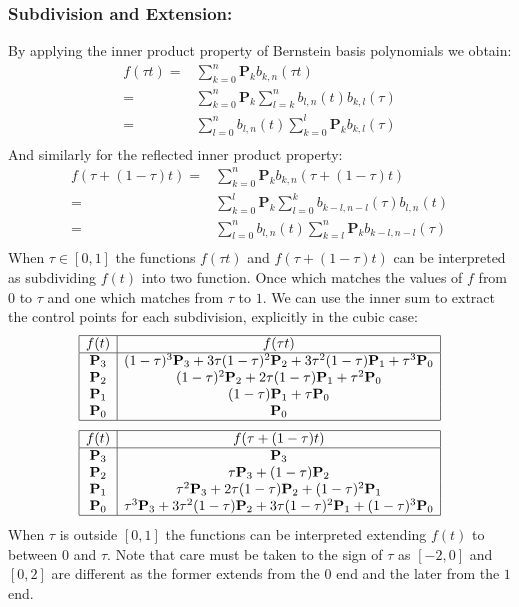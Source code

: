 \subsubsection{Subdivision and Extension:}
By applying the inner product property of Bernstein basis polynomials we obtain:
\[\begin{aligned}
	f(\tau t) =& \sum_{k=0}^n\mathbf{P}_kb_{k,n}(\tau t)\\
	=&\sum_{k=0}^n\mathbf{P}_k\sum_{l=k}^nb_{l,n}(t)b_{k,l}(\tau)\\
	=&\sum_{l=0}^nb_{l,n}(t)\sum_{k=0}^l\mathbf{P}_kb_{k,l}(\tau)\\
\end{aligned}\]
And similarly for the reflected inner product property:
\[\begin{aligned}
	f(\tau +(1-\tau)t)=& \sum_{k=0}^n\mathbf{P}_kb_{k,n}(\tau+(1-\tau)t)\\
	=&\sum_{k=0}^l\mathbf{P}_k\sum_{l=0}^kb_{k-l,n-l}(\tau)b_{l,n}(t)\\
	=&\sum_{l=0}^nb_{l,n}(t)\sum_{k=l}^n\mathbf{P}_kb_{k-l,n-l}(\tau)\\
\end{aligned}\]
When $\tau\in[0,1]$ the functions $f(\tau t)$ and $f(\tau + (1-\tau)t)$ can be interpreted as subdividing $f(t)$ into two function.
Once which matches the values of $f$ from $0$ to $\tau$ and one which matches from $\tau$ to $1$.
We can use the inner sum to extract the control points for each subdivision,
explicitly in the cubic case:
\[\begin{array}{|c|c|}
	\hline
	f(t)&f(\tau t)\\
	\hline
	\mathbf{P}_3&(1-\tau)^3\mathbf{P}_3+3\tau(1-\tau)^2\mathbf{P}_2+3\tau^2(1-\tau)\mathbf{P}_1+\tau^3\mathbf{P}_0\\
	\mathbf{P}_2&(1-\tau)^2\mathbf{P}_2+2\tau(1-\tau)\mathbf{P}_1+\tau^2\mathbf{P}_0\\
	\mathbf{P}_1&(1-\tau)\mathbf{P}_1+\tau \mathbf{P}_0\\
	\mathbf{P}_0&\mathbf{P}_0\\
	\hline
\end{array}\]
\[\begin{array}{|c|c|}
	\hline
	f(t)&f(\tau+(1-\tau)t)\\
	\hline
	\mathbf{P}_3&\mathbf{P}_3\\
	\mathbf{P}_2&\tau \mathbf{P}_3+(1-\tau)\mathbf{P}_2\\
	\mathbf{P}_1&\tau^2\mathbf{P}_3+2\tau(1-\tau)\mathbf{P}_2+(1-\tau)^2\mathbf{P}_1\\
	\mathbf{P}_0&\tau^3\mathbf{P}_3+3\tau^2(1-\tau)\mathbf{P}_2+3\tau(1-\tau)^2\mathbf{P}_1+(1-\tau)^3\mathbf{P}_0\\
	\hline
\end{array}\]
When $\tau$ is outside $[0,1]$ the functions can be interpreted extending $f(t)$ to between $0$ and $\tau$.
Note that care must be taken to the sign of $\tau$ as $[-2,0]$ and $[0,2]$ are different as the former extends from the $0$ end and the later from the $1$ end.
